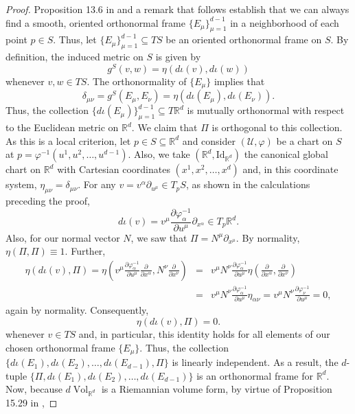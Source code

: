 \documentclass{article}
\newcommand{\p}{\partial}
\newcommand{\R}{\mathbb{R}}
\newcommand{\al}{\alpha}
\newcommand{\f}[2]{\frac{#1}{#2}}
\newcommand{\lp}{\left(}
\newcommand{\rp}{\right)}
\theoremstyle{theorem}
\newcommand{\Vol}{\operatorname{Vol}}
\begin{document}
\begin{proof}


Proposition 13.6 in \cite{lee2013smooth} and a remark that follows establish that we can always find a smooth, oriented orthonormal frame $\{ E_\mu \}_{\mu = 1}^{d-1}$ in a neighborhood of each point  $p\in S$. Thus, let $\{ E_\mu \}_{\mu = 1}^{d-1}\subseteq TS$ be an oriented orthonormal frame on $S$. By definition, the induced metric on $S$ is given by 
\begin{equation*}
    g^S(v,w) = \eta(d\iota (v), d\iota(w))
\end{equation*}
whenever $v,w\in TS$. The orthonormality of $\{E_\mu\}$ implies that 
\begin{equation*}
    \delta_{\mu\nu} = g^S(E_\mu,E_\nu) = \eta(d\iota(E_\mu), d\iota(E_\nu)).
\end{equation*}
Thus, the collection $\{ d\iota(E_\mu) \}_{\mu = 1}^{d-1}\subseteq T\R^d$ is mutually orthonormal with respect to the Euclidean metric on $\mathbb{R}^d$. We claim that $\Pi$ is orthogonal to this collection. As this is a local criterion, let $p\in S\subseteq\mathbb{R}^d$ and consider $(\mathcal{U},\varphi)$ be a chart on $S$ at $p=\varphi^{-1}(u^1,u^2,\dots,u^{d-1})$. Also, we take $(\mathbb{R}^d,\mbox{Id}_{\mathbb{R}^d})$ the canonical global chart on $\mathbb{R}^d$ with Cartesian coordinates $(x^1,x^2,\dots,x^d)$ and, in this coordinate system, $\eta_{\mu\nu}=\delta_{\mu\nu}$. For any $v=v^\alpha\partial_{u^{\mu}}\in T_pS$, as shown in the calculations preceding the proof,
\begin{equation*}
d\iota(v)=v^{\mu}\frac{\partial\varphi_\al^{-1}}{\partial u^\mu}\partial_{x^{\al}}\in T_p\mathbb{R}^d.
\end{equation*}
Also, for our normal vector $N$, we saw that $\Pi=N^{\mu}\partial_{x^\mu}$. By normality, $\eta(\Pi,\Pi)\equiv 1$. Further,
\begin{eqnarray*}
    \eta(d\iota(v) , \Pi) = \eta\lp v^\mu\f{\p \varphi_\al^{-1} }{ \p u^\mu} \f{\p}{\p x^\al}, N^\nu \f{\p}{\p x^\nu} \rp &=&  v^\mu N^\nu \f{\p \varphi_\al^{-1} }{ \p u^\mu} \eta\lp \f{\p}{\p x^\alpha}, \f{\p}{\p x^\nu} \rp \\
    &=& v^\mu N^\nu \f{\p \varphi_\al^{-1} }{ \p u^\mu} \eta_{\alpha\nu} = v^\mu N^\nu \f{\p \varphi_\nu^{-1} }{ \p u^\mu} = 0,
\end{eqnarray*}
again by normality. Consequently,
\begin{equation*}
    \eta(d\iota(v), \Pi) = 0.
\end{equation*}
whenever $v\in TS$ and, in particular, this identity holds for all elements of our chosen orthonormal frame $\{E_\mu\}$. Thus, the collection $\{ d\iota(E_1), d\iota(E_2),\dots,d\iota(E_{d-1}),\Pi\}$ is linearly independent. As a result, the $d$-tuple $\{\Pi, d\iota(E_1),d\iota(E_2),\dots, d\iota(E_{d-1})\}$ is an orthonormal frame for $\mathbb{R}^d$. Now, because $d\Vol_{\R^d}$ is a Riemannian volume form, by virtue of Proposition 15.29 in \cite{lee2013smooth}, 

\end{proof}
\end{document}
